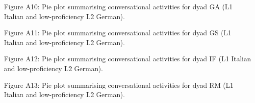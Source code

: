 \begin{stylecaption}
Figure A10: Pie plot summarising conversational activities for dyad GA (L1 Italian and low-proficiency L2 German).
\end{stylecaption}

\begin{stylecaption}
  
 
\end{stylecaption}

\begin{stylecaption}
Figure A11: Pie plot summarising conversational activities for dyad GS (L1 Italian and low-proficiency L2 German).
\end{stylecaption}

\begin{stylecaption}
  
 
\end{stylecaption}

\begin{stylecaption}
Figure A12: Pie plot summarising conversational activities for dyad IF (L1 Italian and low-proficiency L2 German).
\end{stylecaption}

\begin{stylecaption}
  
 
\end{stylecaption}

\begin{stylecaption}
Figure A13: Pie plot summarising conversational activities for dyad RM (L1 Italian and low-proficiency L2 German).
\end{stylecaption}

\begin{stylecaption}
  
 
\end{stylecaption}

